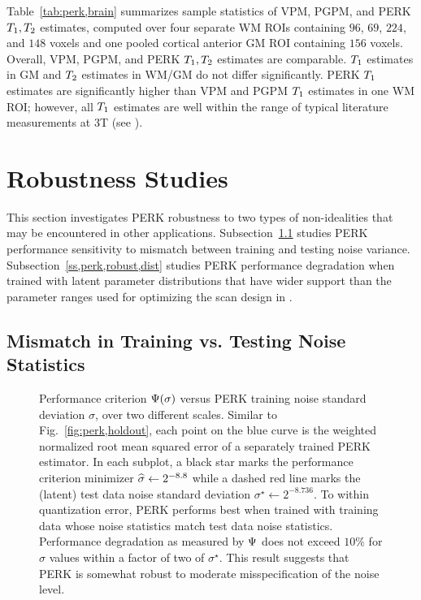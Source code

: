 Table~\ref{tab:perk,brain} summarizes sample statistics
of VPM, PGPM, and PERK $T_1,T_2$ estimates,
computed over four separate WM ROIs 
containing $96$, $69$, $224$, and $148$ voxels
and one pooled cortical anterior GM ROI 
containing $156$ voxels.
Overall,
VPM, PGPM, and PERK $T_1,T_2$ estimates are comparable.
$T_1$ estimates in GM
and $T_2$ estimates in WM/GM
do not differ significantly.
PERK $T_1$ estimates are significantly higher
than VPM and PGPM $T_1$ estimates 
in one WM ROI;
however,
all $T_1$ estimates 
are well within the range 
of typical literature measurements at 3T 
(see \eg \cite{wansapura:99:nrt, stanisz:05:ttr}).

\section{Robustness Studies}
\label{s,perk,robust}

This section investigates PERK robustness
to two types of non-idealities
that may be encountered 
in other applications.
Subsection~\ref{ss,perk,robust,noise} 
studies PERK performance sensitivity
to mismatch between training and testing noise variance.
Subsection~\ref{ss,perk,robust,dist}
studies PERK performance degradation
when trained 
with latent parameter distributions
that have wider support
than the parameter ranges
used for optimizing the scan design
in \cite{nataraj:17:oms}.

\subsection{Mismatch in Training vs. Testing Noise Statistics}
\label{ss,perk,robust,noise}

\begin{figure}[!t]
	\centering
	\hspace{0cm}
	\caption{%
		Performance criterion $\costa{\sigma}$
		versus PERK training noise standard deviation $\sigma$,
		over two different scales.
		Similar to Fig.~\ref{fig:perk,holdout},
		each point on the blue curve
		is the weighted normalized root mean squared error
		of a separately trained PERK estimator.
		In each subplot,
		a black star marks 
		the performance criterion minimizer
		$\widehat{\sigma} \gets 2^{-8.8}$
		while a dashed red line
		marks the (latent) test data noise standard deviation 
		$\sigma^\star \gets 2^{-8.736}$.
		To within quantization error,
		PERK performs best 
		when trained with training data
		whose noise statistics 
		match test data noise statistics.
		Performance degradation as measured by $\Psi$ 
		does not exceed $10\%$
		for $\sigma$ values within a factor of two
		of $\sigma^\star$.
		This result suggests 
		that PERK is somewhat robust
		to moderate misspecification of the noise level.
	}%
	\label{fig:perk,robust}
\end{figure}

